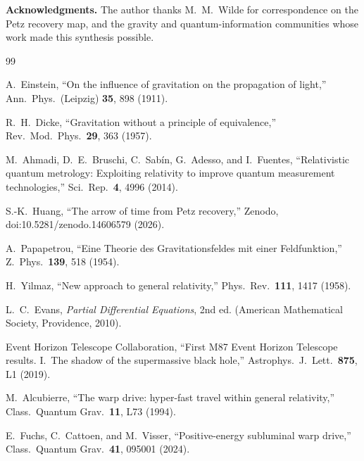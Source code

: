 \documentclass[12pt]{article}
\renewcommand{\baselinestretch}{2.0}
\begin{document}
\bigskip

\noindent\textbf{Acknowledgments.}
The author thanks M.~M.~Wilde for correspondence on the Petz recovery
map, and the gravity and quantum-information communities whose work made
this synthesis possible.


\newpage
\label{refs_start}
\begingroup\sloppy
\renewcommand{\baselinestretch}{1.2}\selectfont
\begin{thebibliography}{99}

A.~Einstein,
``On the influence of gravitation on the propagation of light,''
Ann.\ Phys.\ (Leipzig) \textbf{35}, 898 (1911).

R.~H.~Dicke,
``Gravitation without a principle of equivalence,''
Rev.\ Mod.\ Phys.\ \textbf{29}, 363 (1957).

M.~Ahmadi, D.~E.~Bruschi, C.~Sab\'{i}n, G.~Adesso, and I.~Fuentes,
``Relativistic quantum metrology: Exploiting relativity to improve quantum
measurement technologies,''
Sci.\ Rep.\ \textbf{4}, 4996 (2014).

S.-K.~Huang,
``The arrow of time from Petz recovery,''
Zenodo, doi:10.5281/zenodo.14606579 (2026).

A.~Papapetrou,
``Eine Theorie des Gravitationsfeldes mit einer Feldfunktion,''
Z.\ Phys.\ \textbf{139}, 518 (1954).

H.~Yilmaz,
``New approach to general relativity,''
Phys.\ Rev.\ \textbf{111}, 1417 (1958).

L.~C.~Evans,
\emph{Partial Differential Equations}, 2nd ed.
(American Mathematical Society, Providence, 2010).

Event Horizon Telescope Collaboration,
``First M87 Event Horizon Telescope results. I.\ The shadow of the
supermassive black hole,''
Astrophys.\ J.\ Lett.\ \textbf{875}, L1 (2019).

M.~Alcubierre,
``The warp drive: hyper-fast travel within general relativity,''
Class.\ Quantum Grav.\ \textbf{11}, L73 (1994).

E.~Fuchs, C.~Cattoen, and M.~Visser,
``Positive-energy subluminal warp drive,''
Class.\ Quantum Grav.\ \textbf{41}, 095001 (2024).


\end{thebibliography}
\end{document}
